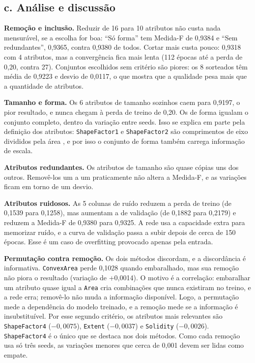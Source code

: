 \subsection*{c. Análise e discussão}

\textbf{Remoção e inclusão.} Reduzir de 16 para 10 atributos não custa nada mensurável, se a escolha for boa: ``Só forma'' tem Medida-F de 0,9384 e ``Sem redundantes'', 0,9365, contra 0,9380 de todos. Cortar mais custa pouco: 0,9318 com 4 atributos,
mas a convergência fica mais lenta (112 épocas até a perda de 0,20, contra 27). Conjuntos escolhidos sem critério são piores: os 8 sorteados têm média de 0,9223 e desvio de 0,0117, o que mostra que a qualidade pesa mais que a quantidade de atributos.

\textbf{Tamanho e forma.} Os 6 atributos de tamanho sozinhos caem para 0,9197, o pior resultado, e nunca chegam à perda de treino de 0,20. Os de forma igualam o conjunto completo, dentro da variação entre seeds. Isso se explica em parte pela definição dos atributos: \texttt{ShapeFactor1} e
\texttt{ShapeFactor2} são comprimentos de eixo divididos pela área \cite{koklu2020}, e por isso o conjunto de forma também carrega informação de escala.

\textbf{Atributos redundantes.} Os atributos de tamanho são quase cópias uns dos outros. Removê-los um a um praticamente não altera a Medida-F, e as variações ficam em torno de um desvio.

\textbf{Atributos ruidosos.} As 5 colunas de ruído reduzem a perda de treino (de 0,1539 para 0,1258), mas aumentam a de validação (de 0,1882 para 0,2179) e reduzem a Medida-F de 0,9380 para 0,9325. A rede usa a capacidade extra para memorizar ruído, e a curva de validação
passa a subir depois de cerca de 150 épocas. Esse é um caso de overfitting provocado apenas pela entrada.

\textbf{Permutação contra remoção.} Os dois métodos discordam, e a discordância é informativa. \texttt{ConvexArea} perde 0,1028 quando embaralhado, mas sua remoção não piora o resultado (variação de +0,0014). O motivo é a correlação: embaralhar um atributo quase igual a \texttt{Area} cria combinações
que nunca existiram no treino, e a rede erra; removê-lo não muda a informação disponível. Logo, a permutação mede a dependência do modelo treinado, e a remoção mede se a informação é insubstituível. Por esse segundo critério, os atributos mais relevantes são
\texttt{ShapeFactor4} ($-0{,}0075$), \texttt{Extent} ($-0{,}0037$) e \texttt{Solidity} ($-0{,}0026$). \texttt{ShapeFactor4} é o único que se destaca nos dois métodos. Como cada remoção usa só três seeds, as variações menores que cerca de 0,001 devem ser lidas como empate.

